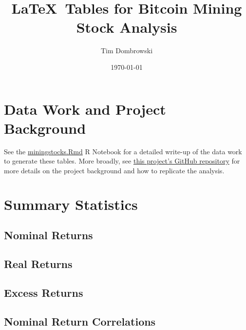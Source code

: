 \documentclass[]{article}
\title{\LaTeX~Tables for Bitcoin Mining Stock Analysis}
\author{Tim Dombrowski}
\date{\today}
\begin{document}
\maketitle

\large

\section{Data Work and Project Background}

See the \href{https://github.com/tim-dombrowski/bitcoin-miningstocks-project/blob/main/R\%20Notebook/miningstocks.Rmd}{miningstocks.Rmd} R Notebook for a detailed write-up of the data work to generate these tables. More broadly, see \href{https://github.com/tim-dombrowski/bitcoin-miningstocks-project}{this project's GitHub repository} for more details on the project background and how to replicate the analysis.

\section{Summary Statistics}

\subsection{Nominal Returns}



\pagebreak

\subsection{Real Returns}




\subsection{Excess Returns}



\pagebreak

\subsection{Nominal Return Correlations}
\end{document}
